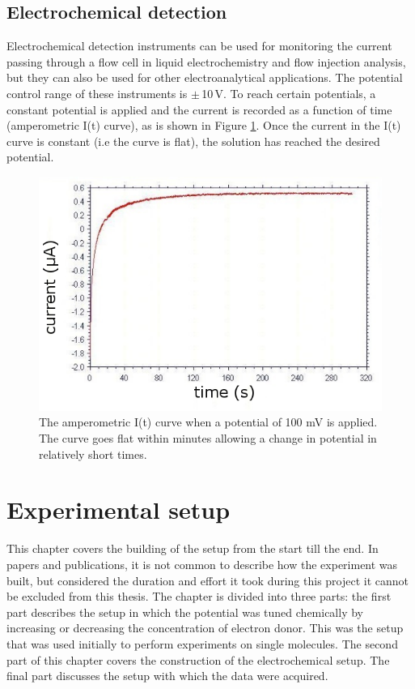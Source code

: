 \documentclass[twoside,single]{lion-msc}
\begin{document}
\section{Electrochemical detection}
Electrochemical detection instruments can be used for monitoring the current passing through a flow cell in liquid electrochemistry and flow injection analysis, but they can also be used for other electroanalytical applications. The potential control range of these instruments is $\pm$\,10\,V. To reach certain potentials, a constant potential is applied and the current is recorded as a function of time (amperometric I(t) curve), as is shown in Figure \ref{amp_curve}. Once the current in the I(t) curve is constant (i.e the curve is flat), the solution has reached the desired potential. 

\begin{figure}[ht!]
\centering
\includegraphics[width=.95 \linewidth]{it100mV}
\caption{The amperometric I(t) curve when a potential of 100 mV is applied. The curve goes flat within minutes allowing a change in potential in relatively short times.}
\label{amp_curve}
\end{figure}



\chapter{Experimental setup}

This chapter covers the building of the setup from the start till the end. In papers and publications, it is not  common to describe how the experiment was built, but considered the duration and effort it took during this project it cannot be excluded from this thesis. The chapter is divided into three parts: the first part describes the setup in which the potential was tuned chemically by increasing or decreasing the concentration of  electron donor. This was the setup that was used initially to perform experiments on single molecules. The second part of this chapter covers the construction of the electrochemical setup. The final part discusses the setup with which the data were acquired.
\end{document}
